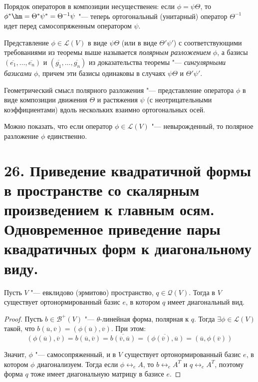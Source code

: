 \begin{note}
    Порядок операторов в композиции несущественен: если $\phi = \psi\Theta$, то $\phi^* \hm= \Theta^*\psi^* = \Theta^{-1}\psi$ "--- теперь ортогональный (унитарный) оператор $\Theta^{-1}$ идет перед самосопряженным оператором $\psi$.
\end{note}

\begin{definition}
    Представление $\phi \in \mathcal{L}(V)$ в виде $\psi\Theta$ (или в виде $\Theta'\psi'$) с соответствующими требованиями из теоремы выше называется \textit{полярным разложением} $\phi$, а базисы $(\overline{e_1}, \dots, \overline{e_n})$ и $(\overline{g_1}, \dots, \overline{g_n})$ из доказательства теоремы "--- \textit{сингулярными базисами} $\phi$, причем эти базисы одинаковы в случаях $\psi\Theta$ и $\Theta'\psi'$.
\end{definition}

\begin{note}
    Геометрический смысл полярного разложения "--- представление оператора $\phi$ в виде композиции движения $\Theta$ и растяжения $\psi$ (с неотрицательными коэффициентами) вдоль нескольких взаимно ортогональных осей.
\end{note}

\begin{note}
    Можно показать, что если оператор $\phi \in \mathcal{L}(V)$ "--- невырожденный, то полярное разложение $\phi$ единственно.
\end{note}

\section{26. Приведение квадратичной формы в пространстве со скалярным произведением к главным осям. Одновременное приведение пары квадратичных форм к диагональному виду.}

\begin{theorem}
    Пусть $V$ "--- евклидово (эрмитово) пространство,  $q \in \mathcal{Q}(V)$. Тогда в $V$ существует ортонормированный базис $e$, в котором $q$ имеет диагональный вид.
\end{theorem}

\begin{proof}
    Пусть $b \in \mathcal{B}^+(V)$ "--- $\theta$-линейная форма, полярная к $q$. Тогда $\exists \phi \in \mathcal{L}(V)$ такой, что $b(\overline{u}, \overline{v}) = (\phi(\overline{u}), \overline{v})$. При этом:
    \[(\phi(\overline{u}), \overline{v}) = b(\overline{u}, \overline{v}) = \overline{b(\overline{v}, \overline{u})} = \overline{(\phi(\overline{v}), \overline{u})} = (\overline{u}, \phi(\overline{v}))\]
    
    Значит, $\phi$ "--- самосопряженный, и в $V$ существует ортонормированный базис $e$, в котором $\phi$ диагонализуем. Тогда если $\phi \leftrightarrow_e A$, то $b \leftrightarrow_e A^T$ и $q \leftrightarrow_e A^T$, поэтому форма $q$ тоже имеет диагональную матрицу в базисе $e$.
\end{proof}

